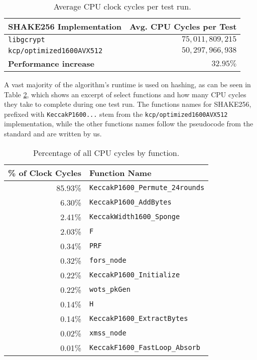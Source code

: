 \documentclass[journal=tosc,notanonymous]{iacrtrans}
\begin{document}
\begin{table}[ht]
\centering
\begin{tabular}{ l | r }
    \textbf{SHAKE256 Implementation} & \textbf{Avg. CPU Cycles per Test} \\
    \hline
    \texttt{libgcrypt} & $75,011,809,215$ \\
    \texttt{kcp/optimized1600AVX512} & $50,297,966,938$ \\
    \hline
    \textbf{Performance increase} & $32.95\%$
\end{tabular}
     \caption{\label{tab:cycles}Average CPU clock cycles per test run.}
\end{table}

A vast majority of the algorithm's runtime is used on hashing, as can be seen in Table \ref{tab:perf}, which shows an excerpt of select functions and how many CPU cycles they take to complete during one test run.
The functions names for SHAKE256, prefixed with \texttt{KeccakP1600...} stem from the \texttt{kcp/optimized1600AVX512} implementation, while the other functions names follow the pseudocode from the standard and are written by us.

\begin{table}[ht]
\centering
\begin{tabular}{ r | l }
    \textbf{\% of Clock Cycles} & \textbf{Function Name} \\
    \hline
    85.93\% & \texttt{KeccakP1600\_Permute\_24rounds} \\
     6.30\% & \texttt{KeccakP1600\_AddBytes} \\
     2.41\% & \texttt{KeccakWidth1600\_Sponge} \\
     2.03\% & \texttt{F} \\
     0.34\% & \texttt{PRF} \\
     0.32\% & \texttt{fors\_node} \\
     0.22\% & \texttt{KeccakP1600\_Initialize} \\
     0.22\% & \texttt{wots\_pkGen} \\
     0.14\% & \texttt{H} \\
     0.14\% & \texttt{KeccakP1600\_ExtractBytes} \\
     0.02\% & \texttt{xmss\_node} \\
     0.01\% & \texttt{KeccakF1600\_FastLoop\_Absorb}
\end{tabular}
     \caption{\label{tab:perf}Percentage of all CPU cycles by function.}
\end{table}
\end{document}
